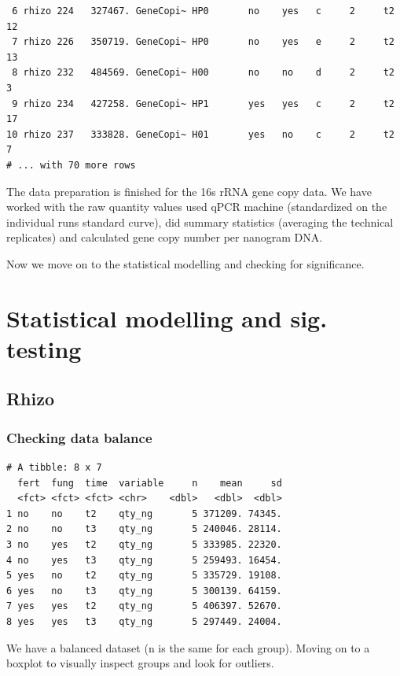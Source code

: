 \documentclass[twoside,12pt,final]{ucthesis-CA2012}
\begin{document}
\begin{ucmainmatter}
\begin{verbatim}
 6 rhizo 224   327467. GeneCopi~ HP0       no    yes   c     2     t2         12
 7 rhizo 226   350719. GeneCopi~ HP0       no    yes   e     2     t2         13
 8 rhizo 232   484569. GeneCopi~ H00       no    no    d     2     t2          3
 9 rhizo 234   427258. GeneCopi~ HP1       yes   yes   c     2     t2         17
10 rhizo 237   333828. GeneCopi~ H01       yes   no    c     2     t2          7
# ... with 70 more rows
\end{verbatim}
The data preparation is finished for the 16s rRNA gene copy data. We have worked with the raw quantity values used qPCR machine (standardized on the individual runs standard curve), did summary statistics (averaging the technical replicates) and calculated gene copy number per nanogram DNA.

Now we move on to the statistical modelling and checking for significance.

\hypertarget{statistical-modelling-and-sig.-testing}{%
\chapter{Statistical modelling and sig. testing}\label{statistical-modelling-and-sig.-testing}}

\hypertarget{rhizo}{%
\section{Rhizo}\label{rhizo}}

\hypertarget{checking-data-balance}{%
\subsection{Checking data balance}\label{checking-data-balance}}
\begin{verbatim}
# A tibble: 8 x 7
  fert  fung  time  variable     n    mean     sd
  <fct> <fct> <fct> <chr>    <dbl>   <dbl>  <dbl>
1 no    no    t2    qty_ng       5 371209. 74345.
2 no    no    t3    qty_ng       5 240046. 28114.
3 no    yes   t2    qty_ng       5 333985. 22320.
4 no    yes   t3    qty_ng       5 259493. 16454.
5 yes   no    t2    qty_ng       5 335729. 19108.
6 yes   no    t3    qty_ng       5 300139. 64159.
7 yes   yes   t2    qty_ng       5 406397. 52670.
8 yes   yes   t3    qty_ng       5 297449. 24004.
\end{verbatim}
We have a balanced dataset (n is the same for each group). Moving on to a boxplot to visually inspect groups and look for outliers.


\end{ucmainmatter}
\end{document}
